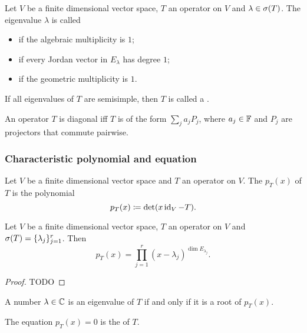 \begin{definition}
Let $V$ be a finite dimensional vector space, $T$ an operator on $V$ and $\lambda\in\sigma(T)$. The eigenvalue $\lambda$ is called
\begin{itemize}
    \item {} if the algebraic multiplicity is $1$;
    \item {} if every Jordan vector in $E_\lambda$ has degree $1$;
    \item {} if the geometric multiplicity is $1$.
\end{itemize}
If all eigenvalues of $T$ are semisimple, then $T$ is called a .
\end{definition}

\begin{lemma}
An operator $T$ is diagonal iff $T$ is of the form $\sum_j a_jP_j$, where $a_j\in \mathbb{F}$ and $P_j$ are projectors that commute pairwise.
\end{lemma}

\subsubsection{Characteristic polynomial and equation}
\begin{definition}
Let $V$ be a finite dimensional vector space and $T$ an operator on $V$. The  $p_T(x)$ of $T$ is the polynomial
\[ p_T(x) \coloneqq \det(x\operatorname{id}_V - T). \]
\end{definition}

\begin{proposition}
Let $V$ be a finite dimensional vector space, $T$ an operator on $V$ and $\sigma(T) = \{\lambda_j\}_{j=1}^r$. Then
\[ p_T(x) = \prod_{j=1}^r(x - \lambda_j)^{\dim E_{\lambda_j}}. \]
\end{proposition}
\begin{proof}
TODO
\end{proof}
\begin{corollary}
A number $\lambda\in \mathbb{C}$ is an eigenvalue of $T$ \textup{if and only if} it is a root of $p_T(x)$.
\end{corollary}

\begin{definition}
The equation $p_T(x) = 0$ is the  of $T$.
\end{definition}

